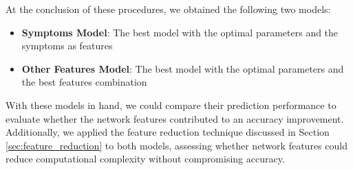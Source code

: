 At the conclusion of these procedures, we obtained the following two models:\\

\begin{itemize}
    \setlength\itemsep{0.4em} %
    \item \textbf{Symptoms Model}: The best model with the optimal parameters and the symptoms as features
    \item \textbf{Other Features Model}: The best model with the optimal parameters and the best features combination
\end{itemize}
\vspace{0.4cm}

With these models in hand, we could compare their prediction performance to evaluate whether the network 
features contributed to an accuracy improvement. Additionally, we applied the feature reduction technique discussed 
in Section \ref{sec:feature_reduction} to both models, assessing whether network features could reduce computational 
complexity without compromising accuracy.

